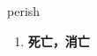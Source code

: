 
\begin{frame}
{\huge perish}
\begin{center}
\begin{enumerate}\Large
  \item \textbf{死亡，消亡}
\end{enumerate}
\end{center}
\end{frame}
